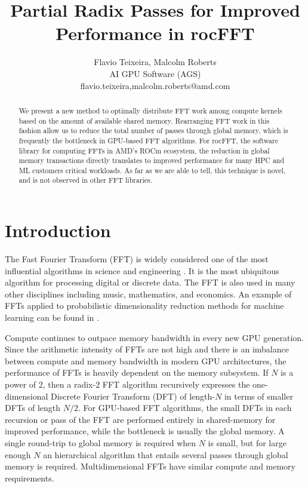 \documentclass[11pt, onecolumn, journal,compsoc]{IEEEtran}
\title{Partial Radix Passes for Improved Performance in rocFFT}
\author{Flavio Teixeira, Malcolm Roberts \\
AI GPU Software (AGS) \\
flavio.teixeira,malcolm.roberts@amd.com} %
\theoremstyle{problemstyle}
\begin{document}
\maketitle %

\begin{abstract}

We present a new method to optimally distribute FFT work among compute
kernels based on the amount of available shared memory. Rearranging
FFT work in this fashion allow us to reduce the total number of passes
through global memory, which is frequently the bottleneck in GPU-based
FFT algorithms. For rocFFT, the software library for computing FFTs in
AMD's ROCm ecosystem, the reduction in global memory transactions
directly translates to improved performance for many HPC and ML
customers critical workloads.  As far as we are able to tell, this
technique is novel, and is not observed in other FFT libraries.

\end{abstract}


\section{Introduction}

The Fast Fourier Transform (FFT) is widely considered one of the most influential algorithms in science and engineering \cite{garravan00}. It is the most ubiquitous algorithm for processing digital or discrete data. The FFT is also used in many other disciplines including music, mathematics, and economics. An example of FFTs applied to probabilistic dimensionality reduction methods for machine learning can be found in \cite{nasseira20}.

Compute continues to outpace memory bandwidth in every new GPU
generation. Since the arithmetic intensity of FFTs are not high and
there is an imbalance between compute and memory bandwidth in modern GPU
architectures, the performance of FFTs is heavily dependent on the
memory subsystem. If $N$ is a power of 2, then a radix-$2$ FFT
algorithm recursively expresses the one-dimensional Discrete Fourier
Transform (DFT) of length-$N$ in terms of smaller DFTs of length
$N/2$. For GPU-based FFT algorithms, the small DFTs in each recursion
or pass of the FFT are performed entirely in shared-memory for
improved performance, while the bottleneck is usually the global
memory. A single round-trip to global memory is required when $N$ is
small, but for large enough $N$ an hierarchical algorithm that entails
several passes through global memory is required. Multidimensional
FFTs have similar compute and memory requirements.
\end{document}
